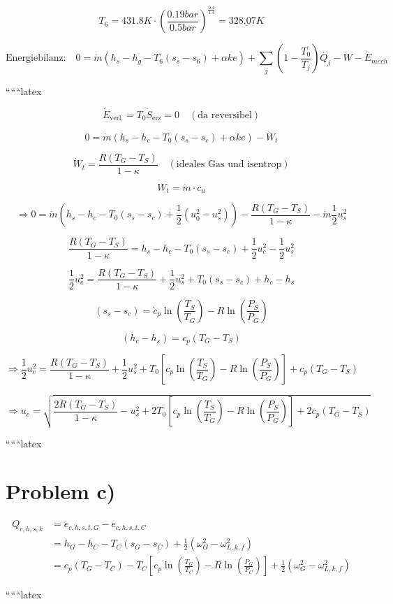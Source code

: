 \[
T_6 = 431.8K \cdot \left( \frac{0.19 bar}{0.5 bar} \right)^{\frac{0.4}{1.4}} = \underline{328.07K}
\]

\[
\text{Energiebilanz:} \quad 0 = \dot{m} (h_s - h_g - T_6 (s_s - s_6) + \alpha ke) + \sum_j (1 - \frac{T_0}{T_j}) \dot{Q_j} - \dot{W} - \dot{E}_{mech}
\]

``````latex

\[
\dot{E}_{\text{verl.}} = T_0 \dot{S}_{\text{erz}} = 0 \quad (\text{da reversibel})
\]

\[
0 = \dot{m} (h_s - h_c - T_0 (s_s - s_c) + \alpha k e) - \dot{W}_t
\]

\[
\dot{W}_t = \frac{R (T_G - T_S)}{1 - \kappa} \quad (\text{ideales Gas und isentrop})
\]

\[
W_t = \dot{m} \cdot c_u
\]

\[
\Rightarrow 0 = \dot{m} \left( h_s - h_c - T_0 (s_s - s_c) + \frac{1}{2} (u_0^2 - u_s^2) \right) - \frac{R (T_G - T_S)}{1 - \kappa} - \dot{m} \frac{1}{2} u_s^2
\]

\[
\frac{R (T_G - T_S)}{1 - \kappa} = h_s - h_c - T_0 (s_s - s_c) + \frac{1}{2} u_c^2 - \frac{1}{2} u_s^2
\]

\[
\frac{1}{2} u_c^2 = \frac{R (T_G - T_S)}{1 - \kappa} + \frac{1}{2} u_s^2 + T_0 (s_s - s_c) + h_c - h_s
\]

\[
(s_s - s_c) = \dot{c}_p \ln \left( \frac{T_S}{T_G} \right) - R \ln \left( \frac{P_S}{P_G} \right)
\]

\[
(h_c - h_s) = c_p (T_G - T_S)
\]

\[
\Rightarrow \frac{1}{2} u_c^2 = \frac{R (T_G - T_S)}{1 - \kappa} + \frac{1}{2} u_s^2 + T_0 \left[ c_p \ln \left( \frac{T_S}{T_G} \right) - R \ln \left( \frac{P_S}{P_G} \right) \right] + c_p (T_G - T_S)
\]

\[
\Rightarrow u_c = \sqrt{\frac{2 R (T_G - T_S)}{1 - \kappa} - u_s^2 + 2 T_0 \left[ c_p \ln \left( \frac{T_S}{T_G} \right) - R \ln \left( \frac{P_S}{P_G} \right) \right] + 2 c_p (T_G - T_S)}
\]

``````latex

\section*{Problem c)}

\begin{align*}
Q_{c,h,s,k} &= e_{c,h,s,t,G} - e_{c,h,s,t,C} \\
&= h_G - h_C - T_C(s_G - s_C) + \frac{1}{2} \left( \omega_G^2 - \omega_{L,k,f}^2 \right) \\
&= c_p (T_G - T_C) - T_C \left[ c_p \ln \left( \frac{T_G}{T_C} \right) - R \ln \left( \frac{P_G}{P_C} \right) \right] + \frac{1}{2} \left( \omega_G^2 - \omega_{L,k,f}^2 \right)
\end{align*}

``````latex


